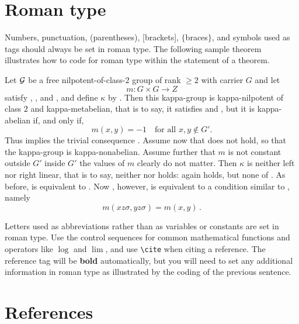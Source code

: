 \section{Roman type}

Numbers, punctuation, (parentheses), [brackets], $\{$braces$\}$, and
symbols used as tags should always be set in roman type.  The following
sample theorem illustrates how to code for roman type within the
statement of a theorem.

\begin{theorem}
Let $\cal G$ be a free nilpotent-of-class-$2$ group of rank
$\ge 2$ with carrier $G$ and let
$$m : G\times G \to Z$$
satisfy , , and , and define
$\kappa$ by .  Then this kappa-group is kappa-nilpotent
of class $2$ and kappa-metabelian, that is to say, it satisfies
 and , but it is kappa-abelian if, and only if,
\begin{equation}
m(x,y) = -1\quad\text{for all $x, y \notin G'$}.
\end{equation}
\rom{(}Thus  implies the trivial consequence
.\rom{)}  Assume now that  does not hold,
so that the kappa-group is kappa-nonabelian.  Assume further that $m$
is not constant outside $G'$ \rom{(}inside $G'$ the values of $m$
clearly do not matter\rom{)}.  Then $\kappa$ is neither left nor right
linear, that is to say, neither  nor  holds:
 again holds, but none of .  As before,
 is equivalent to .  Now , however,
is equivalent to a condition similar to , namely
\begin{equation}
m(xz\sigma, yz\sigma) = m(x,y)\,.
\end{equation}
\end{theorem}

Letters used as abbreviations rather than as variables or constants
are set in roman type.  Use the control sequences \cite[p.~95]{spivak:jot}
for common mathematical functions and operators like $\log$ and $\lim$,
and use \verb+\cite+ when citing a reference.  The reference tag
will be {\bf bold} automatically, but you will need to set any
additional information in roman type as illustrated by the coding of
the previous sentence.

\section{References}

